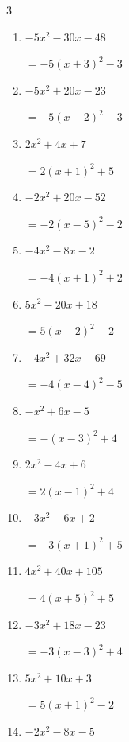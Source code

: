 \begin{multicols}{3}
\begin{enumerate}
  \item $-5x^{2}-30x-48$

        $=-5\left( x+3\right)^{2}-3$

  \item $-5x^{2}+20x-23$

        $=-5\left( x-2\right)^{2}-3$

\columnbreak %

  \item $2x^{2}+4x+7$

        $=2\left( x+1\right)^{2}+5$

  \item $-2x^{2}+20x-52$

        $=-2\left( x-5\right)^{2}-2$

  \item $-4x^{2}-8x-2$

        $=-4\left( x+1\right)^{2}+2$

  \item $5x^{2}-20x+18$

        $=5\left( x-2\right)^{2}-2$

  \item $-4x^{2}+32x-69$

        $=-4\left( x-4\right)^{2}-5$

  \item $-x^{2}+6x-5$

        $=-\left( x-3\right)^{2}+4$

  \item $2x^{2}-4x+6$

        $=2\left( x-1\right)^{2}+4$

  \item $-3x^{2}-6x+2$

        $=-3\left( x+1\right)^{2}+5$

  \item $4x^{2}+40x+105$

        $=4\left( x+5\right)^{2}+5$

  \item $-3x^{2}+18x-23$

        $=-3\left( x-3\right)^{2}+4$

\columnbreak %

\resetques

  \item $5x^{2}+10x+3$

        $=5\left( x+1\right)^{2}-2$

  \item $-2x^{2}-8x-5$


\end{enumerate}
\end{multicols}

